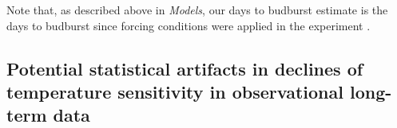 \documentclass{article}
\begin{document}
\par Note that, as described above in \emph{Models}, our days to budburst estimate is the days to budburst since forcing conditions were applied in the experiment \citep[which we stress is not necessarily the days to budburst after the start of ecodormancy][]{chuine2016}.




 



\subsection*{Potential statistical artifacts in declines of temperature sensitivity in observational long-term data} %
\end{document}

